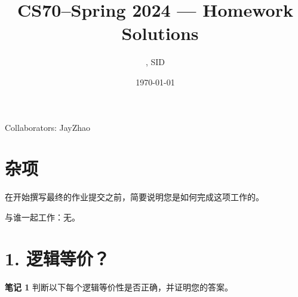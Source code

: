 \documentclass[11pt]{article}
\title{CS70--Spring 2024 --- Homework \Homework \ Solutions}
\author{\Name, SID \SID}
\date{\today}
\begin{document}
\maketitle

Collaborators: JayZhao

\section*{杂项}
在开始撰写最终的作业提交之前，简要说明您是如何完成这项工作的。

与谁一起工作：无。

\section*{1. 逻辑等价？}
\textbf{笔记 1} 判断以下每个逻辑等价性是否正确，并证明您的答案。
\end{document}
